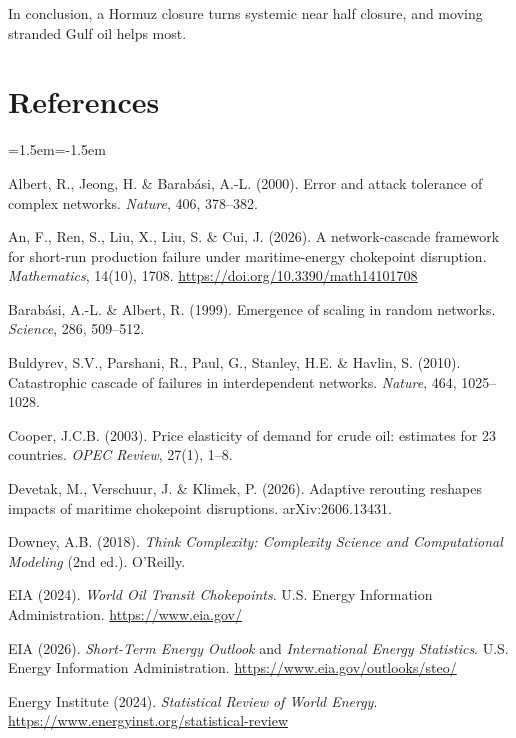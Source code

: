 \documentclass[11pt,a4paper]{article}
\begin{document}
In conclusion, a Hormuz closure turns systemic near half closure, and moving stranded Gulf oil helps most.


\section*{References}
\begin{list}{}{\leftmargin=1.5em\itemindent=-1.5em\itemsep=1pt\parsep=0pt}\small

\item Albert, R., Jeong, H. \& Barabási, A.-L. (2000). Error and attack tolerance of complex networks. \emph{Nature}, 406, 378--382.

\item An, F., Ren, S., Liu, X., Liu, S. \& Cui, J. (2026). A network-cascade framework for short-run production failure under maritime-energy chokepoint disruption. \emph{Mathematics}, 14(10), 1708. \url{https://doi.org/10.3390/math14101708}

\item Barabási, A.-L. \& Albert, R. (1999). Emergence of scaling in random networks. \emph{Science}, 286, 509--512.

\item Buldyrev, S.V., Parshani, R., Paul, G., Stanley, H.E. \& Havlin, S. (2010). Catastrophic cascade of failures in interdependent networks. \emph{Nature}, 464, 1025--1028.

\item Cooper, J.C.B. (2003). Price elasticity of demand for crude oil: estimates for 23 countries. \emph{OPEC Review}, 27(1), 1--8.

\item Devetak, M., Verschuur, J. \& Klimek, P. (2026). Adaptive rerouting reshapes impacts of maritime chokepoint disruptions. arXiv:2606.13431.

\item Downey, A.B. (2018). \emph{Think Complexity: Complexity Science and Computational Modeling} (2nd ed.). O'Reilly.

\item EIA (2024). \emph{World Oil Transit Chokepoints}. U.S. Energy Information Administration. \url{https://www.eia.gov/}

\item EIA (2026). \emph{Short-Term Energy Outlook} and \emph{International Energy Statistics}. U.S. Energy Information Administration. \url{https://www.eia.gov/outlooks/steo/}

\item Energy Institute (2024). \emph{Statistical Review of World Energy}. \url{https://www.energyinst.org/statistical-review}


\end{list}
\end{document}
